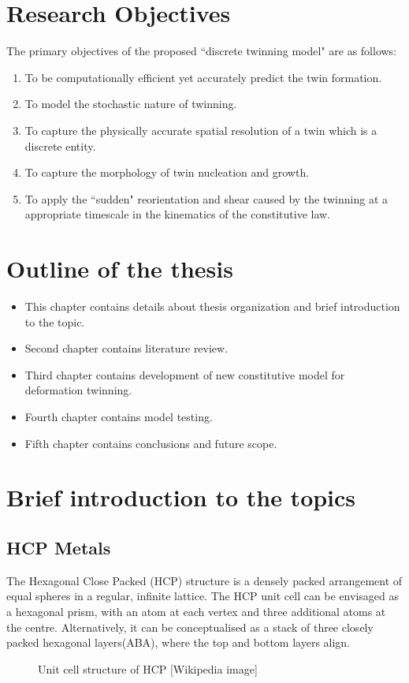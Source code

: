 \section{Research Objectives}
The primary objectives of the proposed ``discrete twinning model" are as follows:
\begin{enumerate}
    \item To be computationally efficient yet accurately predict the twin formation.
    \item To model the stochastic nature of twinning.
    \item To capture the physically accurate spatial resolution of a twin which is a discrete entity. 
    \item To capture the morphology of twin nucleation and growth.
    \item To apply the ``sudden" reorientation and shear caused by the twinning at a appropriate timescale in the kinematics of the constitutive law. 
\end{enumerate}

\section{Outline of the thesis}
\begin{itemize}
    \item This chapter contains details about thesis organization and brief introduction to the topic.
    \item Second chapter contains literature review.
    \item Third chapter contains development of new constitutive model for deformation twinning.
    \item Fourth chapter contains model testing.
    \item Fifth chapter contains conclusions and future scope.
\end{itemize}

\section{Brief introduction to the topics}

\subsection{HCP Metals}
The Hexagonal Close Packed (HCP) structure is a densely packed arrangement of equal spheres in a regular, infinite lattice. The HCP unit cell can be envisaged as a hexagonal prism, with an atom at each vertex and three additional atoms at the centre. Alternatively, it can be conceptualised as a stack of three closely packed hexagonal layers(ABA), where the top and bottom layers align.
\begin{figure}[H]
  \centering
  
  \caption{Unit cell structure of HCP [Wikipedia image]}
\end{figure}

